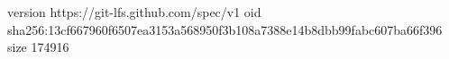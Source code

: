 version https://git-lfs.github.com/spec/v1
oid sha256:13cf667960f6507ea3153a568950f3b108a7388e14b8dbb99fabc607ba66f396
size 174916
